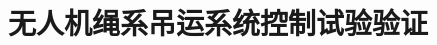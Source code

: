 \documentclass[lang=chs, degree=master, blindreview=false, winfonts=true]{yanputhesis}
\begin{document}




\section{无人机绳系吊运系统控制试验验证}
\end{document}
